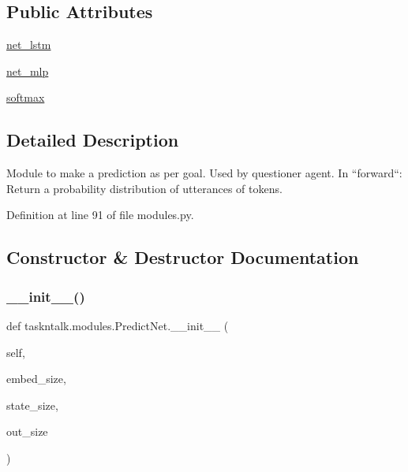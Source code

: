 \subsection*{Public Attributes}
\begin{DoxyCompactItemize}
\item 
\hyperlink{classtaskntalk_1_1modules_1_1PredictNet_af007e09bd94e06d3d34ebfe74b43fac0}{net\+\_\+lstm}
\item 
\hyperlink{classtaskntalk_1_1modules_1_1PredictNet_a095d419f0221e40a3a82c3c68b07ea63}{net\+\_\+mlp}
\item 
\hyperlink{classtaskntalk_1_1modules_1_1PredictNet_ad5625f1758b0a4f7fbc9dd7ce43094b0}{softmax}
\end{DoxyCompactItemize}


\subsection{Detailed Description}
\begin{DoxyVerb}Module to make a prediction as per goal. Used by questioner agent. In
``forward``: Return a probability distribution of utterances of tokens.
\end{DoxyVerb}
 

Definition at line 91 of file modules.\+py.



\subsection{Constructor \& Destructor Documentation}
\mbox{\label{classtaskntalk_1_1modules_1_1PredictNet_ab9af189670626b4121ad1070dc41e04d}} 
\subsubsection{\texorpdfstring{\+\_\+\+\_\+init\+\_\+\+\_\+()}{\_\_init\_\_()}}
{\footnotesize\ttfamily def taskntalk.\+modules.\+Predict\+Net.\+\_\+\+\_\+init\+\_\+\+\_\+ (\begin{DoxyParamCaption}\item[{}]{self,  }\item[{}]{embed\+\_\+size,  }\item[{}]{state\+\_\+size,  }\item[{}]{out\+\_\+size }\end{DoxyParamCaption})}



